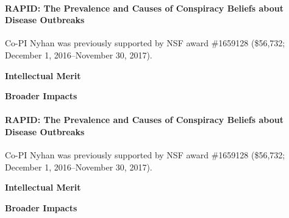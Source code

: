 \paragraph{RAPID: The Prevalence and Causes of Conspiracy Beliefs about Disease Outbreaks} 
Co-PI Nyhan was previously supported by NSF award \#1659128 (\$56,732; December 1, 2016--November 30, 2017).

\noindent\textbf{Intellectual Merit}
%
\lipsum[10]{}

\noindent\textbf{Broader Impacts}
%
\lipsum[11]{}


\paragraph{RAPID: The Prevalence and Causes of Conspiracy Beliefs about Disease Outbreaks} 
Co-PI Nyhan was previously supported by NSF award \#1659128 (\$56,732; December 1, 2016--November 30, 2017).

\noindent\textbf{Intellectual Merit}
%
\lipsum[10]{}

\noindent\textbf{Broader Impacts}
%
\lipsum[11]{}
